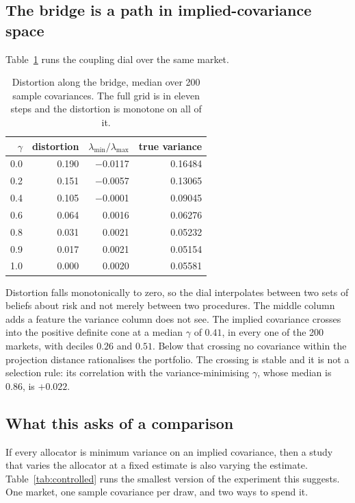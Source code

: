 \documentclass[11pt]{article}
\theoremstyle{remark}
\begin{document}
\subsection{The bridge is a path in implied-covariance space}

Table~\ref{tab:bridgedist} runs the coupling dial over the same market.

\begin{table}[ht]
\centering
\begin{tabular}{rrrr}
\toprule
$\gamma$ & distortion & $\lambda_{\min}/\lambda_{\max}$ & true variance \\
\midrule
0.0 & 0.190 & $-$0.0117 & 0.16484 \\
0.2 & 0.151 & $-$0.0057 & 0.13065 \\
0.4 & 0.105 & $-$0.0001 & 0.09045 \\
0.6 & 0.064 & \phantom{$-$}0.0016 & 0.06276 \\
0.8 & 0.031 & \phantom{$-$}0.0021 & 0.05232 \\
0.9 & 0.017 & \phantom{$-$}0.0021 & 0.05154 \\
1.0 & 0.000 & \phantom{$-$}0.0020 & 0.05581 \\
\bottomrule
\end{tabular}
\caption{Distortion along the bridge, median over 200 sample covariances.
The full grid is in eleven steps and the distortion is monotone on all of
it.}
\label{tab:bridgedist}
\end{table}

Distortion falls monotonically to zero, so the dial interpolates between two
sets of beliefs about risk and not merely between two procedures. The middle
column adds a feature the variance column does not see. The implied
covariance crosses into the positive definite cone at a median $\gamma$ of
$0.41$, in every one of the 200 markets, with deciles $0.26$ and $0.51$.
Below that crossing no covariance within the projection distance rationalises
the portfolio. The crossing is stable and it is not a selection rule: its
correlation with the variance-minimising $\gamma$, whose median is $0.86$, is
$+0.022$.

\subsection{What this asks of a comparison}

If every allocator is minimum variance on an implied covariance, then a
study that varies the allocator at a fixed estimate is also varying the
estimate. Table~\ref{tab:controlled} runs the smallest version of the
experiment this suggests. One market, one sample covariance per draw, and
two ways to spend it.
\end{document}
